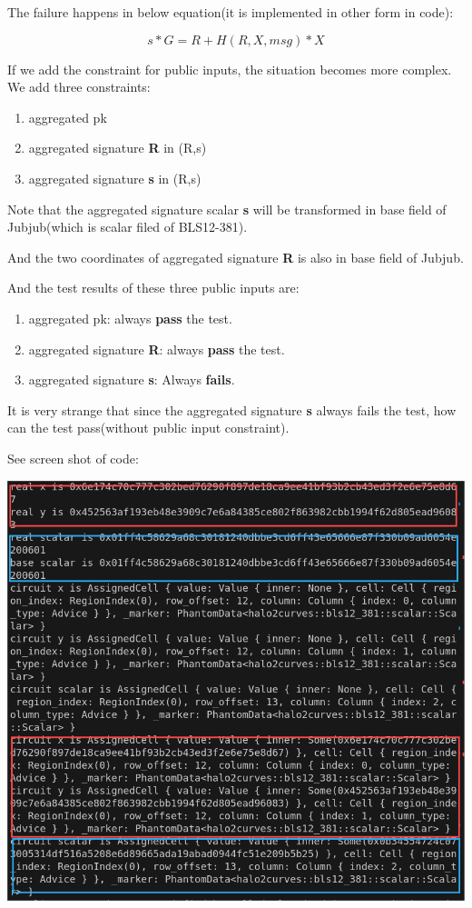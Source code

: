\documentclass{article}
\begin{document}
The failure happens in below equation(it is implemented in other form in code):

\[
s*G = R + H(R,X,msg)*X
\]

If we add the constraint for public inputs, the situation becomes more complex. We add three constraints:
\begin{enumerate}
    \item aggregated pk
    \item aggregated signature \textbf{R} in (R,s)
    \item aggregated signature \textbf{s} in (R,s)
\end{enumerate}

Note that the aggregated signature scalar \textbf{s} will be transformed in base field of Jubjub(which is scalar filed of BLS12-381).

And the two coordinates of aggregated signature \textbf{R} is also in base field of Jubjub.

And the test results of these three public inputs are:

\begin{enumerate}
    \item aggregated pk: always \textbf{pass} the test.
    \item aggregated signature \textbf{R}: always \textbf{pass} the test.
    \item aggregated signature \textbf{s}: Always \textbf{fails}.
\end{enumerate}

It is very strange that since the aggregated signature \textbf{s} always fails the test, how can the test pass(without public input constraint).


See screen shot of code:

\includegraphics[width=1\linewidth]{bug screen shot.png}
\end{document}
